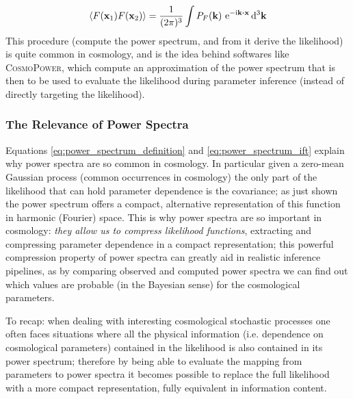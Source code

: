 \begin{equation}
    \label{eq:power_spectrum_ift}
    \expval{F(\vb{x}_1) F(\vb{x}_2)} = \frac{1}{(2\pi)^3} \int P_F(\vb{k}) \  \mathrm{e}^{-\mathrm{i}\vb{k}\vdot\vb{x}} \dd[3]{\vb{k}}
\end{equation}
This procedure (compute the power spectrum, and from it derive the likelihood) is quite common in cosmology, and is the idea behind softwares like \textsc{CosmoPower}, which compute an approximation of the power spectrum that is then to be used to evaluate the likelihood during parameter inference (instead of directly targeting the likelihood).

\subsubsection{The Relevance of Power Spectra}
Equations \eqref{eq:power_spectrum_definition} and \eqref{eq:power_spectrum_ift} explain why power spectra are so common in cosmology. In particular given a zero-mean Gaussian process (common occurrences in cosmology) the only part of the likelihood that can hold parameter dependence is the covariance; as just shown the power spectrum offers a compact, alternative representation of this function in harmonic (Fourier) space.
This is why power spectra are so important in cosmology: \emph{they allow us to compress likelihood functions}, extracting and compressing parameter dependence in a compact representation; this powerful compression property of power spectra can greatly aid in realistic inference pipelines, as by comparing observed and computed power spectra we can find out which values are probable (in the Bayesian sense) for the cosmological parameters.

To recap: when dealing with interesting cosmological stochastic processes one often faces situations where all the physical information (i.e. dependence on cosmological parameters) contained in the likelihood is also contained in its power spectrum; therefore by being able to evaluate the mapping from parameters to power spectra it becomes possible to replace the full likelihood with a more compact representation, fully equivalent in information content.

